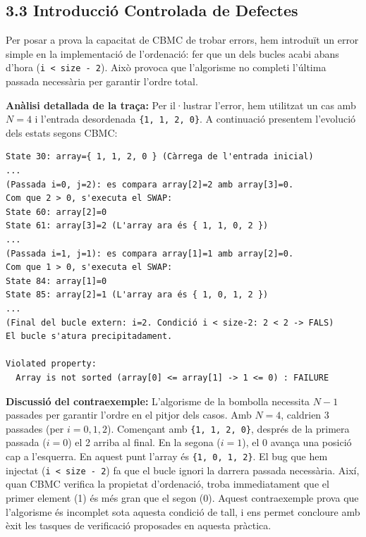 \documentclass[12pt,a4paper]{article}
\begin{document}
\subsection{3.3 Introducció Controlada de Defectes}

Per posar a prova la capacitat de CBMC de trobar errors, hem introduït un error simple en la implementació de l'ordenació: fer que un dels bucles acabi abans d'hora (\texttt{i < size - 2}). Això provoca que l'algorisme no completi l'última passada necessària per garantir l'ordre total.

\textbf{Anàlisi detallada de la traça:} Per il·lustrar l'error, hem utilitzat un cas amb $N=4$ i l'entrada desordenada \texttt{\{1, 1, 2, 0\}}. A continuació presentem l'evolució dels estats segons CBMC:

\begin{verbatim}
State 30: array={ 1, 1, 2, 0 } (Càrrega de l'entrada inicial)
...
(Passada i=0, j=2): es compara array[2]=2 amb array[3]=0.
Com que 2 > 0, s'executa el SWAP:
State 60: array[2]=0
State 61: array[3]=2 (L'array ara és { 1, 1, 0, 2 })
...
(Passada i=1, j=1): es compara array[1]=1 amb array[2]=0.
Com que 1 > 0, s'executa el SWAP:
State 84: array[1]=0
State 85: array[2]=1 (L'array ara és { 1, 0, 1, 2 })
...
(Final del bucle extern: i=2. Condició i < size-2: 2 < 2 -> FALS)
El bucle s'atura precipitadament.

Violated property:
  Array is not sorted (array[0] <= array[1] -> 1 <= 0) : FAILURE
\end{verbatim}

\textbf{Discussió del contraexemple:} L'algorisme de la bombolla necessita $N-1$ passades per garantir l'ordre en el pitjor dels casos. Amb $N=4$, caldrien $3$ passades (per $i=0, 1, 2$). Començant amb \texttt{\{1, 1, 2, 0\}}, després de la primera passada ($i=0$) el 2 arriba al final. En la segona ($i=1$), el 0 avança una posició cap a l'esquerra. En aquest punt l'array és \texttt{\{1, 0, 1, 2\}}. El bug que hem injectat (\texttt{i < size - 2}) fa que el bucle ignori la darrera passada necessària. Així, quan CBMC verifica la propietat d'ordenació, troba immediatament que el primer element (1) és més gran que el segon (0). Aquest contraexemple prova que l'algorisme és incomplet sota aquesta condició de tall, i ens permet concloure amb èxit les tasques de verificació proposades en aquesta pràctica.
\end{document}
